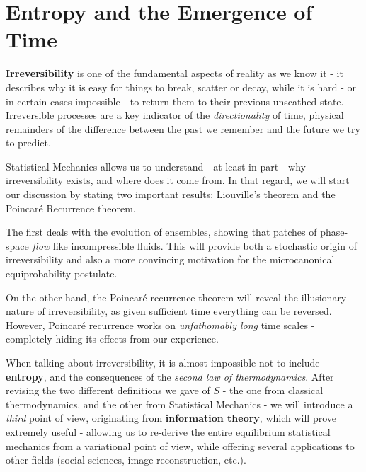 \documentclass[../template.tex]{subfiles}
\begin{document}
\chapter{Entropy and the Emergence of Time}
\textbf{Irreversibility} is one of the fundamental aspects of reality as we know it - it describes why it is easy for things to break, scatter or decay, while it is hard - or in certain cases impossible - to return them to their previous unscathed state. Irreversible processes are a key indicator of the \textit{directionality} of time, physical remainders of the difference between the past we remember and the future we try to predict.

\medskip

Statistical Mechanics allows us to understand - at least in part - why irreversibility exists, and where does it come from. In that regard, we will start our discussion by stating two important results: Liouville's theorem and the Poincaré Recurrence theorem. 

\medskip

The first deals with the evolution of ensembles, showing that patches of phase-space \textit{flow} like incompressible fluids. This will provide both a stochastic origin of irreversibility and also a more convincing motivation for the microcanonical equiprobability postulate.

\medskip

On the other hand, the Poincaré recurrence theorem will reveal the illusionary nature of irreversibility, as given sufficient time everything can be reversed. However, Poincaré recurrence works on \textit{unfathomably long} time scales - completely hiding its effects from our experience. 



\medskip
 
When talking about irreversibility, it is almost impossible not to include \textbf{entropy}, and the consequences of the \textit{second law of thermodynamics}. After revising the two different definitions we gave of $S$ - the one from classical thermodynamics, and the other from Statistical Mechanics - we will introduce a \textit{third} point of view, originating from \textbf{information theory}, which will prove extremely useful - allowing us to re-derive the entire equilibrium statistical mechanics from a variational point of view, while offering several applications to other fields (social sciences, image reconstruction, etc.). 
\end{document}
